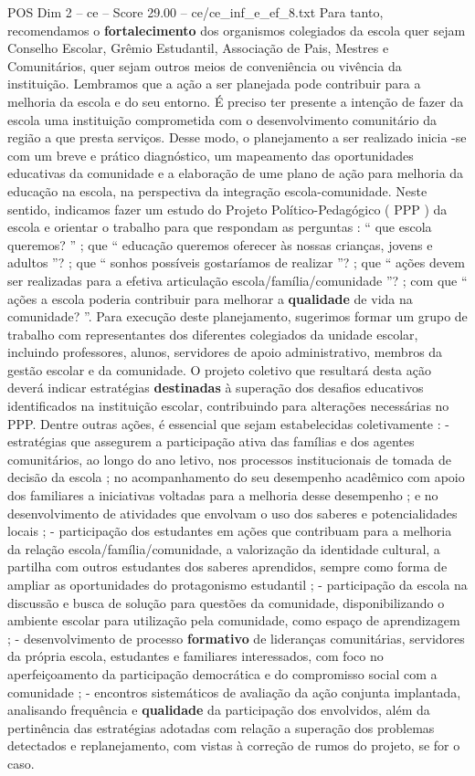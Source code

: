 \begin{textsample}{POS Dim 2 – ce – Score 29.00 – ce/ce\_inf\_e\_ef\_8.txt}
Para tanto, recomendamos o \textbf{fortalecimento} dos organismos colegiados da escola quer sejam Conselho Escolar, Grêmio Estudantil, Associação de Pais, Mestres e Comunitários, quer sejam outros meios de conveniência ou vivência da instituição.
Lembramos que a ação a ser planejada pode contribuir para a melhoria da escola e do seu entorno.
É preciso ter presente a intenção de fazer da escola uma instituição comprometida com o desenvolvimento comunitário da região a que presta serviços.
Desse modo, o planejamento a ser realizado inicia -se com um breve e prático diagnóstico, um mapeamento das oportunidades educativas da comunidade e a elaboração de ume plano de ação para melhoria da educação na escola, na perspectiva da integração escola-comunidade.
Neste sentido, indicamos fazer um estudo do Projeto Político-Pedagógico ( PPP ) da escola e orientar o trabalho para que respondam as perguntas : “ que escola queremos? ” ; que “ educação queremos oferecer às nossas crianças, jovens e adultos ”? ; que “ sonhos possíveis gostaríamos de realizar ”? ; que “ ações devem ser realizadas para a efetiva articulação escola/família/comunidade ”? ; com que “ ações a escola poderia contribuir para melhorar a \textbf{qualidade} de vida na comunidade? ”.
Para execução deste planejamento, sugerimos formar um grupo de trabalho com representantes dos diferentes colegiados da unidade escolar, incluindo professores, alunos, servidores de apoio administrativo, membros da gestão escolar e da comunidade.
O projeto coletivo que resultará desta ação deverá indicar estratégias \textbf{destinadas} à superação dos desafios educativos identificados na instituição escolar, contribuindo para alterações necessárias no PPP.
Dentre outras ações, é essencial que sejam estabelecidas coletivamente : - estratégias que assegurem a participação ativa das famílias e dos agentes comunitários, ao longo do ano letivo, nos processos institucionais de tomada de decisão da escola ; no acompanhamento do seu desempenho acadêmico com apoio dos familiares a iniciativas voltadas para a melhoria desse desempenho ; e no desenvolvimento de atividades que envolvam o uso dos saberes e potencialidades locais ; - participação dos estudantes em ações que contribuam para a melhoria da relação escola/família/comunidade, a valorização da identidade cultural, a partilha com outros estudantes dos saberes aprendidos, sempre como forma de ampliar as oportunidades do protagonismo estudantil ; - participação da escola na discussão e busca de solução para questões da comunidade, disponibilizando o ambiente escolar para utilização pela comunidade, como espaço de aprendizagem ; - desenvolvimento de processo \textbf{formativo} de lideranças comunitárias, servidores da própria escola, estudantes e familiares interessados, com foco no aperfeiçoamento da participação democrática e do compromisso social com a comunidade ; - encontros sistemáticos de avaliação da ação conjunta implantada, analisando frequência e \textbf{qualidade} da participação dos envolvidos, além da pertinência das estratégias adotadas com relação a superação dos problemas detectados e replanejamento, com vistas à correção de rumos do projeto, se for o caso.

\end{textsample}

